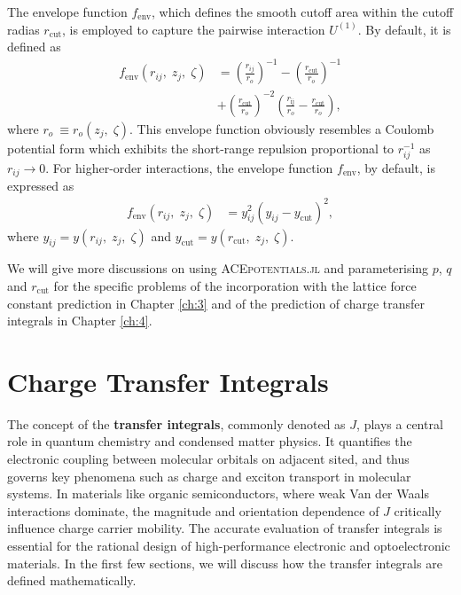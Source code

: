 The envelope function $f_{\text{env}}$, which defines the smooth cutoff area within the cutoff radias $r_{\text{cut}}$, is employed to capture the pairwise interaction $U^{(1)}$.
By default, it is defined as
\begin{equation} \label{equ:2.83}
\begin{split}
f_{\text{env}}(r_{ij},\;z_{j},\;\zeta) &= \left(
    \frac{r_{ij}}{r_{o}}
    \right)^{-1} - \left(
    \frac{r_{\text{cut}}}{r_{o}}
    \right)^{-1}\\
    &
    + \left(
    \frac{r_{\text{cut}}}{r_{o}}
    \right)^{-2}\left(
    \frac{r_{\text{ij}}}{r_{o}}
    -\frac{r_{\text{cut}}}{r_{o}}
    \right), 
\end{split}
\end{equation}
where  $r_{o} ~\equiv r_{o}(z_{j},\;\zeta)$.
This envelope function obviously resembles a Coulomb potential form which exhibits the  short-range repulsion proportional to $r_{ij}^{-1}$ as $r_{ij}\rightarrow 0$.
For higher-order interactions, the envelope function $f_{\text{env}}$, by default, is expressed as  
\begin{equation} \label{equ:2.84}
\begin{split}
f_{\text{env}}(r_{ij},\;z_{j},\;\zeta) &= y_{ij}^{2}(y_{ij}-y_{\text{cut}})^{2},
\end{split}
\end{equation}
where $y_{ij}=y(r_{ij},\;z_{j},\;\zeta)$ and $y_{\text{cut}}=y(r_{\text{cut}},\;z_{j},\;\zeta)$.

We will give more discussions on using \textsc{ACEpotentials.jl} and parameterising $p$, $q$ and $r_{\text{cut}}$ for the specific problems of the incorporation with the lattice force constant prediction in Chapter \ref{ch:3} and of the prediction of charge transfer integrals in Chapter \ref{ch:4}.



\newpage
\section{Charge Transfer Integrals} \label{sec:2.6}
The concept of the \textbf{transfer integrals}, commonly denoted as $J$, plays a central role in quantum chemistry and condensed matter physics.
It quantifies the electronic coupling between molecular orbitals on adjacent sited, and thus governs key phenomena such as charge and exciton transport in molecular systems.
In materials like organic semiconductors, where weak Van der Waals interactions dominate, the magnitude and orientation dependence of $J$ critically influence charge carrier mobility.
The accurate evaluation of transfer integrals is essential for the rational design of high-performance electronic and optoelectronic materials.
In the first few sections, we will discuss how the transfer integrals are defined mathematically.

